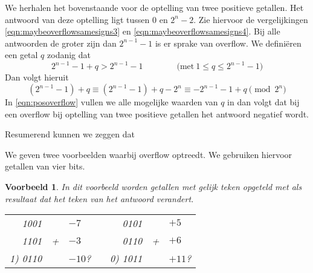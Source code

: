 \documentclass[a4paper,12pt,oneside]{article}
\theoremstyle{own}
\newtheorem{example}{Voorbeeld}[section]
\begin{document}
We herhalen het bovenstaande voor de optelling van twee positieve getallen.
Het antwoord van deze optelling ligt tussen $0$ en $2^n-2$. Zie hiervoor de
vergelijkingen \eqref{eqn:maybeoverflowsamesigns3} en
\eqref{eqn:maybeoverflowsamesigns4}. Bij alle antwoorden de groter zijn dan
$2^{n-1}-1$ is er sprake van overflow. We defini\"eren een getal $q$ zodanig dat
\begin{equation}
2^{n-1} -1 + q > 2^{n-1}-1 \qquad\qquad \mathrm{(met\ } 1 \leq q \leq 2^{n-1}-1\mathrm{)}
\end{equation}
%
Dan volgt hieruit
%
\begin{equation}
\label{eqn:posoverflow}
(2^{n-1}-1) + q \equiv (2^{n-1}-1) + q -2^n \equiv -2^{n-1} -1 + q \pmod{2^n}
\end{equation}
In \eqref{eqn:posoverflow} vullen we alle mogelijke waarden van $q$ in dan
volgt dat bij een overflow bij optelling van twee positieve getallen het
antwoord negatief wordt.

Resumerend kunnen we zeggen dat

\bigskip
\begin{center}
\setlength{\fboxsep}{0.8em}%
\end{center}
\bigskip

We geven twee voorbeelden waarbij overflow optreedt. We gebruiken hiervoor
getallen van vier bits.

\hrulefill
\begin{example}
In dit voorbeeld worden getallen met gelijk teken opgeteld met
als resultaat dat het teken van het antwoord verandert.
\begin{table}[H]
  \centering
  \begin{tabular}{ r c l p{2cm} r c l}
      1001 &   & $-7$    & &    0101 &   & $+5$   \\
      1101 & + & $-3$    & &    0110 & + & $+6$   \\  \cmidrule{1-1}\cmidrule{5-5}
   1) 0110 &   & $-10$?  & & 0) 1011 &   & $+11$? \\
  \end{tabular}
\end{table}
\end{example}
\unskip\hrulefill
\end{document}
